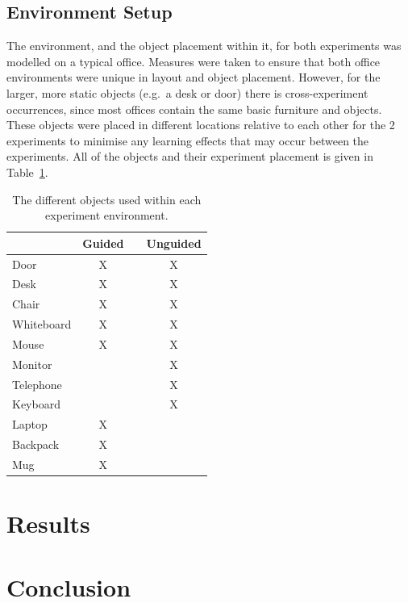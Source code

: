 \documentclass[runningheads]{llncs}
\begin{document}
\subsection{Environment Setup}

The environment, and the object placement within it, for both experiments was modelled on a typical office.
Measures were taken to ensure that both office environments were unique in layout and object placement. 
However, for the larger, more static objects (e.g.\ a desk or door) there is cross-experiment occurrences, since most offices contain the same basic furniture and objects. 
These objects were placed in different locations relative to each other for the 2 experiments to minimise any learning effects that may occur between the experiments. 
All of the objects and their experiment placement is given in Table~\ref{tab:objects}.

\begin{table}
  \centering
  \caption{The different objects used within each experiment environment.}\label{tab:objects}
  \begin{tabular}{p{2cm}cp{0.7cm}c}
    \toprule
    & \bf{Guided} & & \bf{Unguided} \\\midrule
    Door        & X & & X \\\midrule
    Desk	& X & & X \\\midrule
    Chair	& X & & X \\\midrule
    Whiteboard	& X & & X \\\midrule
    Mouse	& X & & X \\\midrule
    Monitor	&   & & X \\\midrule
    Telephone	&   & & X \\\midrule
    Keyboard	&   & & X \\\midrule
    Laptop	& X & &   \\\midrule
    Backpack	& X & &   \\\midrule
    Mug		& X & &   \\\midrule
    \bottomrule
  \end{tabular}
\end{table}

\section{Results}

\section{Conclusion}



\end{document}
